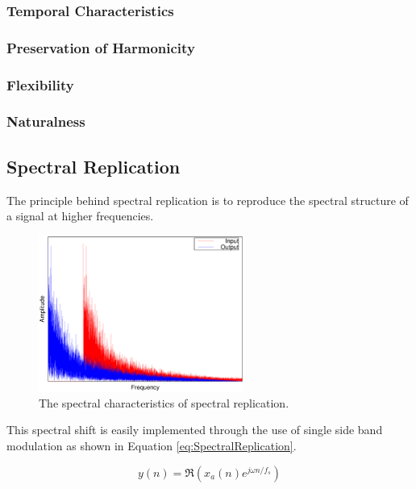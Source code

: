 		\subsubsection*{Temporal Characteristics}
		\subsubsection*{Preservation of Harmonicity}
		\subsubsection*{Flexibility}
		\subsubsection*{Naturalness}

	\subsection{Spectral Replication}
	\label{sec:Excitation-SpectralReplication}
		The principle behind spectral replication is to reproduce the spectral structure of a signal at higher
		frequencies.

		\begin{figure}[h!]
			\centering
			\includegraphics[width=0.6\textwidth]{chapter3/Images/SpectralReplicationSpectrum.eps}
			\caption{The spectral characteristics of spectral replication.}
			\label{fig:SpectralReplication}
		\end{figure}

		This spectral shift is easily implemented through the use of single side band modulation as shown in
		Equation \ref{eq:SpectralReplication}.

		\begin{equation}
			y(n) = \Re \left( x_{a}(n) e^{j\omega  n/ f_{s}} \right)
			\label{eq:SpectralReplication}
		\end{equation}

